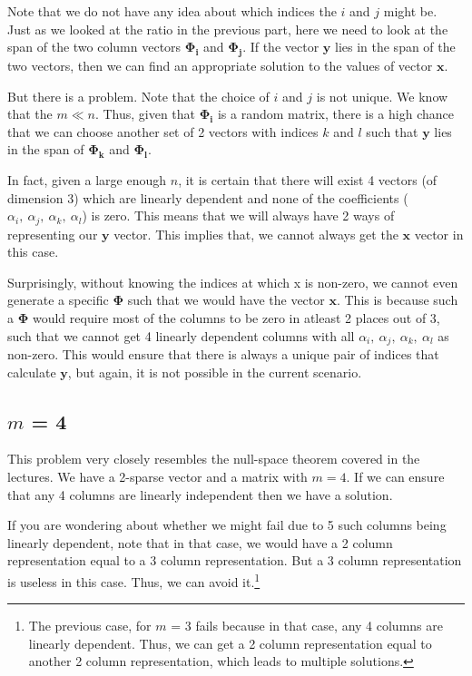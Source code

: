 \documentclass[a4paper,11pt]{article}
\numberwithin{definition}{section}
\numberwithin{mytheorem}{subsection}
\begin{document}
Note that we do not have any idea about which indices the $i$ and $j$ might be.\\
Just as we looked at the ratio in the previous part, here we need to look at the span of the two column vectors $\boldsymbol{\Phi_i}$ and $\boldsymbol{\Phi_j}$. If the vector $\boldsymbol{y}$ lies in the span of the two vectors, then we can find an appropriate solution to the values of vector $\boldsymbol{x}$.

But there is a problem. Note that the choice of $i$ and $j$ is not unique. We know that the $m \ll n$. Thus, given that $\boldsymbol{\Phi_i}$ is a random matrix, there is a high chance that we can choose another set of 2 vectors with indices $k$ and $l$ such that $\boldsymbol{y}$ lies in the span of $\boldsymbol{\Phi_k}$ and $\boldsymbol{\Phi_l}$.

In fact, given a large enough $n$, it is certain that there will exist 4 vectors (of dimension 3) which are linearly dependent and none of the coefficients
($\alpha_i,~\alpha_j,~\alpha_k,~\alpha_l$) is zero. This means that we will always have 2 ways of representing our $\boldsymbol{y}$ vector. This implies that, we cannot always get the $\boldsymbol{x}$ vector in this case.

Surprisingly, without knowing the indices at which x is non-zero, we cannot even generate a specific $\boldsymbol{\Phi}$ such that we would have the vector $\boldsymbol{x}$. This is because such a $\boldsymbol{\Phi}$ would require most of the columns to be zero in atleast 2 places out of 3, such that we cannot get 4 linearly dependent columns with all $\alpha_i,~\alpha_j,~\alpha_k,~\alpha_l$ as non-zero. This would ensure that there is always a unique pair of indices that calculate $\boldsymbol{y}$, but again, it is not possible in the current scenario.


\subsection{$m$ = 4}

This problem very closely resembles the null-space theorem covered in the lectures. We have a 2-sparse vector and a matrix with $m = 4$. If we can ensure that any 4 columns are linearly independent then we have a solution. 

If you are wondering about whether we might fail due to 5 such columns being linearly dependent, note that in that case, we would have a 2 column representation equal to a 3 column representation. But a 3 column representation is useless in this case. Thus, we can avoid it.\footnote{The previous case, for $m$ = 3 fails because in that case, any 4 columns are linearly dependent. Thus, we can get a 2 column representation equal to another 2 column representation, which leads to multiple solutions.}
\end{document}
